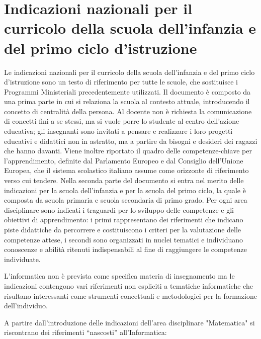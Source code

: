 \documentclass[12pt]{report}
\begin{document}
\section{Indicazioni nazionali per il curricolo della scuola dell'infanzia e del primo ciclo d'istruzione}
\label{indicazioni}
Le indicazioni nazionali per il curricolo della scuola dell'infanzia e del primo ciclo d’istruzione \cite{indicazioniNazionali} sono un testo di riferimento per tutte le scuole, che sostituisce i Programmi Ministeriali precedentemente utilizzati.
Il documento è composto da una prima parte in cui si relaziona la scuola al contesto attuale, introducendo il concetto di centralità della persona. Al docente non è richiesta la comunicazione di concetti fini a se stessi, ma si vuole porre lo studente al centro dell'azione educativa; gli insegnanti sono invitati a pensare e realizzare i loro progetti educativi e didattici non in astratto, ma a partire da bisogni e desideri dei ragazzi che hanno davanti.
Viene inoltre riportato il quadro delle competenze-chiave per l’apprendimento, definite dal Parlamento Europeo e dal Consiglio dell'Unione Europea, che il sistema scolastico italiano assume come orizzonte di riferimento verso cui tendere.
Nella seconda parte del documento si entra nel merito delle indicazioni per la scuola dell'infanzia e per la scuola del primo ciclo, la quale è composta da scuola primaria e scuola secondaria di primo grado.
Per ogni area disciplinare sono indicati i traguardi per lo sviluppo delle competenze e gli obiettivi di apprendimento: i primi rappresentano dei riferimenti che indicano piste didattiche da percorrere e costituiscono i criteri per la valutazione delle competenze attese, i secondi sono organizzati in nuclei tematici e individuano conoscenze e abilità ritenuti indispensabili al fine di raggiungere le competenze individuate.

L’informatica non è prevista come specifica materia di insegnamento ma le indicazioni contengono vari riferimenti non espliciti a tematiche informatiche che risultano interessanti come strumenti concettuali e metodologici per la formazione dell'individuo. 

A partire dall'introduzione delle indicazioni dell'area disciplinare "Matematica" si riscontrano dei riferimenti “nascosti” all'Informatica:
\end{document}
